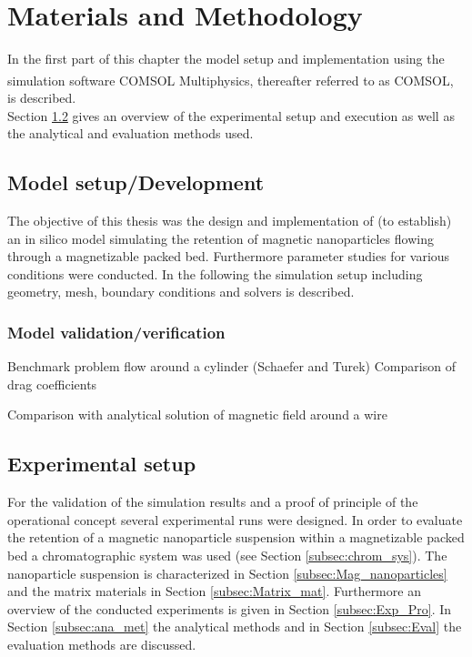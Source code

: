 \chapter{Materials and Methodology}
\label{chap:chap_mat}

In the first part of this chapter the model setup and implementation using the simulation software COMSOL Multiphysics\textsuperscript{\textregistered}, thereafter referred to as COMSOL, is described.\\
Section \ref{sec:Exp_setup} gives an overview of the experimental setup and execution as well as the analytical and evaluation methods used.  


\section{Model setup/Development}
\label{sec:Model_setup}
The objective of this thesis was the design and implementation of (to establish) an in silico model simulating the retention of magnetic nanoparticles flowing through a magnetizable packed bed. Furthermore parameter studies for various conditions were conducted. In the following the simulation setup including geometry, mesh, boundary conditions and solvers is described.    


\subsection{Model validation/verification}
\label{subsec:model_val}
Benchmark problem flow around a cylinder (Schaefer and Turek)
Comparison of drag coefficients

Comparison with analytical solution of magnetic field around a wire

\section{Experimental setup}
\label{sec:Exp_setup}
For the validation of the simulation results and a proof of principle of the operational concept several experimental runs were designed. In order to evaluate the retention of a magnetic nanoparticle suspension within a magnetizable packed bed a chromatographic system was used (see Section \ref{subsec:chrom_sys}). The nanoparticle suspension is characterized in Section \ref{subsec:Mag_nanoparticles} and the matrix materials in Section \ref{subsec:Matrix_mat}. Furthermore an overview of the conducted experiments is given in Section \ref{subsec:Exp_Pro}. In Section \ref{subsec:ana_met} the analytical methods and in Section \ref{subsec:Eval} the evaluation methods are discussed.    


